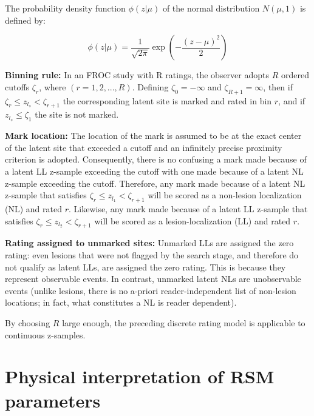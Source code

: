 \documentclass[
]{book}
\begin{document}
The probability density function \(\phi\left ( z | \mu \right )\) of the normal distribution \(N \left ( \mu, 1 \right )\) is defined by:

\begin{equation} 
\phi\left ( z | \mu \right )=\frac{1}{\sqrt{2\pi}}\exp\left ( -\frac{(z-\mu)^2}{2} \right )
\label{eq:rsm-pdf-phi-mu}
\end{equation}

\textbf{Binning rule:} In an FROC study with R ratings, the observer adopts \(R\) ordered cutoffs \(\zeta_r\), where \(\left ( r = 1, 2, ..., R \right )\). Defining \(\zeta_0 = -\infty\) and \(\zeta_{R+1} = \infty\), then if \(\zeta_r \leq z_{l_s} < \zeta_{r+1}\) the corresponding latent site is marked and rated in bin \(r\), and if \(z_{l_s} \leq \zeta_1\) the site is not marked.

\textbf{Mark location:} The location of the mark is assumed to be at the exact center of the latent site that exceeded a cutoff and an infinitely precise proximity criterion is adopted. Consequently, there is no confusing a mark made because of a latent LL z-sample exceeding the cutoff with one made because of a latent NL z-sample exceeding the cutoff. Therefore, any mark made because of a latent NL z-sample that satisfies \(\zeta_r \leq z_{l_1} < \zeta_{r+1}\) will be scored as a non-lesion localization (NL) and rated \(r\). Likewise, any mark made because of a latent LL z-sample that satisfies \(\zeta_r \leq z_{l_2} < \zeta_{r+1}\) will be scored as a lesion-localization (LL) and rated \(r\).

\textbf{Rating assigned to unmarked sites:} Unmarked LLs are assigned the zero rating: even lesions that were not flagged by the search stage, and therefore do not qualify as latent LLs, are assigned the zero rating. This is because they represent observable events. In contrast, unmarked latent NLs are unobservable events (unlike lesions, there is no a-priori reader-independent list of non-lesion locations; in fact, what constitutes a NL is reader dependent).

By choosing \(R\) large enough, the preceding discrete rating model is applicable to continuous z-samples.

\hypertarget{rsm-parameter-interpretations}{%
\section{Physical interpretation of RSM parameters}\label{rsm-parameter-interpretations}}
\end{document}
